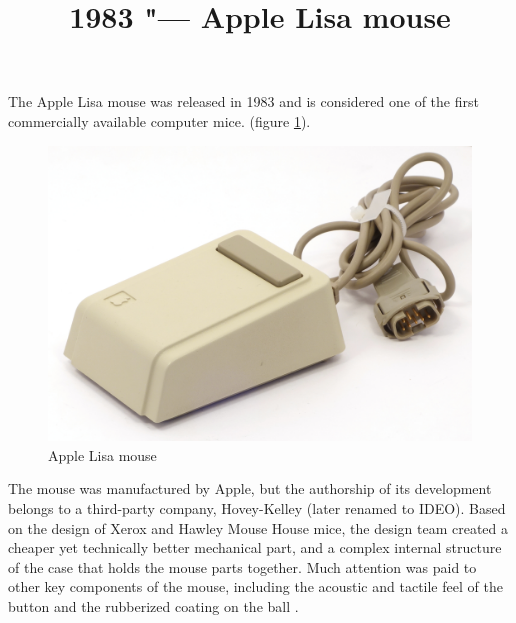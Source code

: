 \documentclass[11pt, a4paper]{article}
\begin{document}
\title{1983 "--- Apple Lisa mouse}
\date{}
\maketitle

The Apple Lisa mouse was released in 1983 \cite{mouses} and is considered one of the first commercially available computer mice. (figure \ref{fig:AppleLisaPic}).

\begin{figure}[h]
   \centering
    \includegraphics[scale=0.5]{1983_apple_lisa_mouse/applenorm_30.jpg}
    \caption{Apple Lisa mouse}
    \label{fig:AppleLisaPic}
\end{figure}

The mouse was manufactured by Apple, but the authorship of its development belongs to a third-party company, Hovey-Kelley (later renamed to IDEO). Based on the design of Xerox and Hawley Mouse House mice, the design team created a cheaper yet technically better mechanical part, and a complex internal structure of the case that holds the mouse parts together. Much attention was paid to other key components of the mouse, including the acoustic and tactile feel of the button and the rubberized coating on the ball \cite{ideo}.
\end{document}
